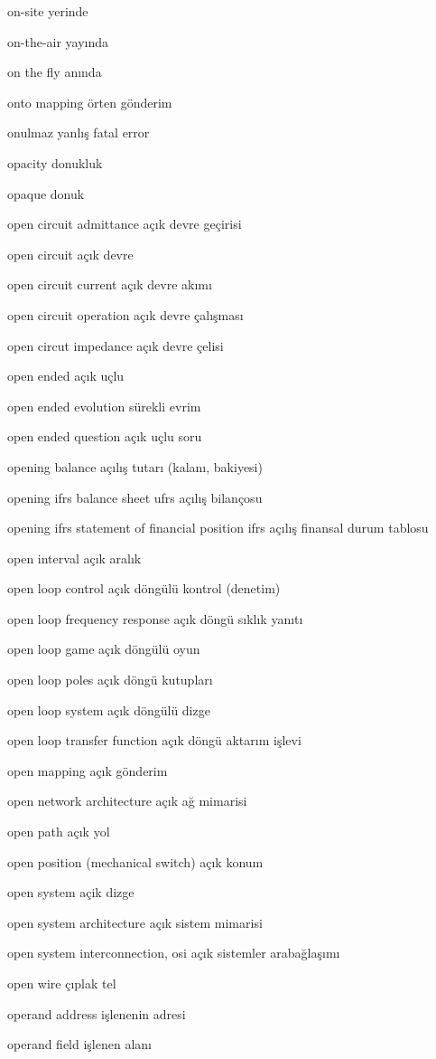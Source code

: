 \documentclass[12pt,fleqn]{article}\usepackage{../../common}
\begin{document}
on-site yerinde

on-the-air yayında

on the fly anında

onto mapping örten gönderim

onulmaz yanlış fatal error

opacity donukluk

opaque donuk

open circuit admittance açık devre geçirisi

open circuit açık devre

open circuit current açık devre akımı

open circuit operation açık devre çalışması

open circut impedance açık devre çelisi

open ended açık uçlu

open ended evolution sürekli evrim

open ended question açık uçlu soru

opening balance açılış tutarı (kalanı, bakiyesi)

opening ifrs balance sheet ufrs açılış bilançosu

opening ifrs statement of financial position ifrs açılış finansal durum tablosu

open interval açık aralık

open loop control açık döngülü kontrol (denetim)

open loop frequency response açık döngü sıklık yanıtı

open loop game açık döngülü oyun

open loop poles açık döngü kutupları

open loop system açık döngülü dizge

open loop transfer function açık döngü aktarım işlevi

open mapping açık gönderim

open network architecture açık ağ mimarisi

open path açık yol

open position (mechanical switch) açık konum

open system açik dizge

open system architecture açık sistem mimarisi

open system interconnection, osi açık sistemler arabağlaşımı

open wire çıplak tel

operand address işlenenin adresi

operand field işlenen alanı
\end{document}
